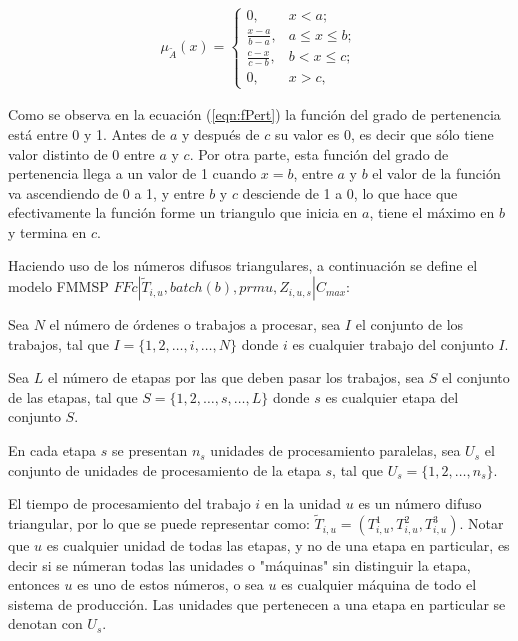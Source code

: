 \documentclass{article}
\def\notac_modelo{$FFc | \tilde{T}_{i, u}, batch(b), prmu, Z_{i, u, s} | C_{max}$}
\begin{document}
\begin{align}
    \label{eqn:fPert}
    \mu_{\tilde{A}}(x) =
    \begin{cases}
        0,   & x < a;\\
        \frac{x-a}{b-a},   & a \leq x \leq b;\\
        \frac{c-x}{c-b},   & b < x \leq c;\\
        0,   & x > c,
    \end{cases}
\end{align}

Como se observa en la ecuación (\ref{eqn:fPert}) la función del grado de pertenencia está entre 0 y 1. Antes de $a$ y después de $c$ su valor es 0, es decir que sólo tiene valor distinto de 0 entre $a$ y $c$. Por otra parte, esta función del grado de pertenencia llega a un valor de 1 cuando $x = b$, entre $a$ y $b$ el valor de la función va ascendiendo de 0 a 1, y entre $b$ y $c$ desciende de 1 a 0, lo que hace que efectivamente la función forme un triangulo que inicia en $a$, tiene el máximo en $b$ y termina en $c$. \autocite{fuzzyNum}

\vspace{\baselineskip}
Haciendo uso de los números difusos triangulares, a continuación se define el modelo FMMSP \notac_modelo: \autocite{modFMMSP}

\vspace{\baselineskip}
Sea $N$ el número de órdenes o trabajos a procesar, sea $I$ el conjunto de los trabajos, tal que $I = \{1,2,\dots,i,\dots,N\}$ donde $i$ es cualquier trabajo del conjunto $I$.

\vspace{\baselineskip}
Sea $L$ el número de etapas por las que deben pasar los trabajos, sea $S$ el conjunto de las etapas, tal que $S = \{1,2,\dots,s,\dots,L\}$ donde $s$ es cualquier etapa del conjunto $S$.

\vspace{\baselineskip}
En cada etapa $s$ se presentan $n_s$ unidades de procesamiento paralelas, sea $U_s$ el conjunto de unidades de procesamiento de la etapa $s$, tal que $U_s = \{1,2,\dots,n_s\}$.

\vspace{\baselineskip}
El tiempo de procesamiento del trabajo $i$ en la unidad $u$ es un número difuso triangular, por lo que se puede representar como: $\tilde{T}_{i,u} = (T_{i,u}^{1},T_{i,u}^{2},T_{i,u}^{3})$. Notar que $u$ es cualquier unidad de todas las etapas, y no de una etapa en particular, es decir si se númeran todas las unidades o "máquinas" sin distinguir la etapa, entonces $u$ es uno de estos números, o sea $u$ es cualquier máquina de todo el sistema de producción. Las unidades que pertenecen a una etapa en particular se denotan con $U_s$.
\end{document}

